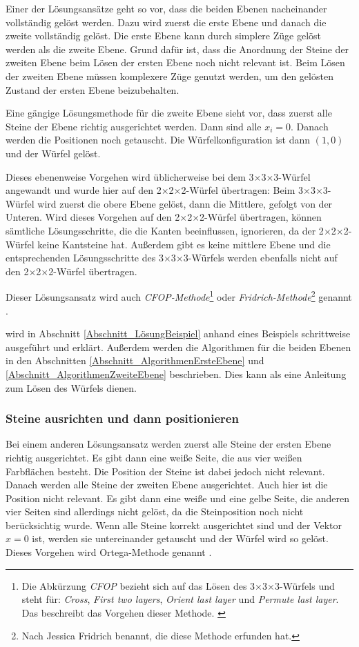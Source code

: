 \documentclass[12pt,a4paper, usenames, dvipsnames]{article}
\theoremstyle{mystyle}
\theoremstyle{definition}
\newcommand{\Ttwo}{2$\times$2$\times$2-}
\newcommand{\Tthree}{3$\times$3$\times$3-}
\begin{document}
Einer der Lösungsansätze geht so vor, dass die beiden Ebenen nacheinander vollständig gelöst werden. Dazu wird zuerst die erste Ebene und danach die zweite vollständig gelöst. Die erste Ebene kann durch simplere Züge gelöst werden als die zweite Ebene. Grund dafür ist, dass die Anordnung der Steine der zweiten Ebene beim Lösen der ersten Ebene noch nicht relevant ist. Beim Lösen der zweiten Ebene müssen komplexere Züge genutzt werden, um den gelösten Zustand der ersten Ebene beizubehalten. 

Eine gängige Lösungsmethode für die zweite Ebene sieht vor, dass zuerst alle Steine der Ebene richtig ausgerichtet werden. Dann sind alle $x_i=0$. Danach werden die Positionen noch getauscht. Die Würfelkonfiguration ist dann $(1,0)$ und der Würfel gelöst.

Dieses ebenenweise Vorgehen wird üblicherweise bei dem \Tthree Würfel angewandt und wurde hier auf den \Ttwo Würfel übertragen: Beim \Tthree Würfel wird zuerst die obere Ebene gelöst, dann die Mittlere, gefolgt von der Unteren. Wird dieses Vorgehen auf den \Ttwo Würfel übertragen, können sämtliche Lösungsschritte, die die Kanten beeinflussen, ignorieren, da der \Ttwo Würfel keine Kantsteine hat. Außerdem gibt es keine mittlere Ebene und die entsprechenden Lösungsschritte des \Tthree Würfels werden ebenfalls nicht auf den \Ttwo Würfel übertragen.

Dieser Lösungsansatz wird auch \textit{CFOP-Methode}\footnote{Die Abkürzung \textit{CFOP} bezieht sich auf das Lösen des \Tthree Würfels und steht für: \textit{Cross}, \textit{First two layers}, \textit{Orient last layer} und \textit{Permute last layer}. Das beschreibt das Vorgehen dieser Methode. \cite{DDJT}} oder \textit{Fridrich-Methode}\footnote{Nach Jessica Fridrich benannt, die diese Methode erfunden hat.} genannt \cite{DDJT}.

wird in Abschnitt \ref{Abschnitt_LösungBeispiel} anhand eines Beispiels schrittweise ausgeführt und erklärt. Außerdem werden die Algorithmen für die beiden Ebenen in den Abschnitten \ref{Abschnitt_AlgorithmenErsteEbene} und \ref{Abschnitt_AlgorithmenZweiteEbene} beschrieben. Dies kann als eine Anleitung zum Lösen des Würfels dienen.

\subsubsection*{Steine ausrichten und dann positionieren}

Bei einem anderen Lösungsansatz werden zuerst alle Steine der ersten Ebene richtig ausgerichtet. Es gibt dann eine weiße Seite, die aus vier weißen Farbflächen besteht. Die Position der Steine ist dabei jedoch nicht relevant. Danach werden alle Steine der zweiten Ebene ausgerichtet. Auch hier ist die Position nicht relevant. Es gibt dann eine weiße und eine gelbe Seite, die anderen vier Seiten sind allerdings nicht gelöst, da die Steinposition noch nicht berücksichtig wurde.
Wenn alle Steine korrekt ausgerichtet sind und der Vektor $x=0$ ist, werden sie untereinander getauscht und der Würfel wird so gelöst. Dieses Vorgehen wird Ortega-Methode genannt \cite{RF2}.
\end{document}
